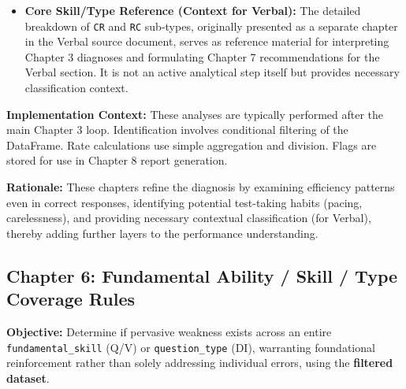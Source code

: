 \documentclass{article}
\begin{document}
\begin{itemize}
    \item \textbf{Core Skill/Type Reference (Context for Verbal):} The detailed breakdown of \texttt{CR} and \texttt{RC} sub-types, originally presented as a separate chapter in the Verbal source document, serves as reference material for interpreting Chapter 3 diagnoses and formulating Chapter 7 recommendations for the Verbal section. It is not an active analytical step itself but provides necessary classification context.
\end{itemize}

\textbf{Implementation Context:} These analyses are typically performed after the main Chapter 3 loop. Identification involves conditional filtering of the DataFrame. Rate calculations use simple aggregation and division. Flags are stored for use in Chapter 8 report generation.

\textbf{Rationale:} These chapters refine the diagnosis by examining efficiency patterns even in correct responses, identifying potential test-taking habits (pacing, carelessness), and providing necessary contextual classification (for Verbal), thereby adding further layers to the performance understanding.

\subsection{Chapter 6: Fundamental Ability / Skill / Type Coverage Rules}

\textbf{Objective:} Determine if pervasive weakness exists across an entire \texttt{fundamental\_skill} (Q/V) or \texttt{question\_type} (DI), warranting foundational reinforcement rather than solely addressing individual errors, using the \textbf{filtered dataset}.
\end{document}
